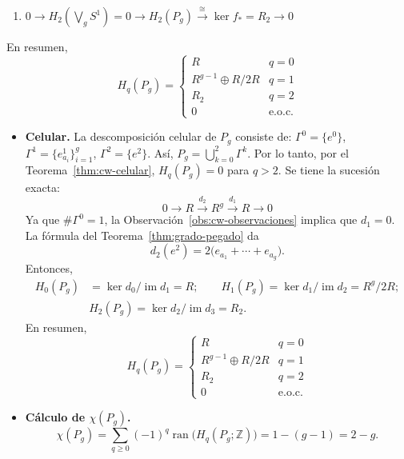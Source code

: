 \documentclass[11pt,a4paper]{article}
\theoremstyle{plain}
\theoremstyle{definition}
\theoremstyle{remark}
\newcommand{\ZZ}{\mathbb Z}
\DeclareMathOperator{\ran}{ran}
\DeclareMathOperator{\im}{im}
\begin{document}
\begin{enumerate}[label=\arabic*.,leftmargin=*]
\begin{enumerate}[label=\alph*)]
\begin{enumerate}[label=\arabic*)]
Sea
\[
\phi:R^g\twoheadrightarrow R^{g-1}\oplus R/2R, \qquad
(r_1,\dots,r_g)\mapsto(r_1-r_g,r_2-r_g\dots,r_{g-1}-r_g,r_g).
\]
Entonces, $\ker\phi=\im f_*$. De esta manera, se sigue el isomorfismo:
\[
R^g/2R\cong R^{g-1}\oplus R/2R.
\]
\item $0\to H_2\left(\bigvee_gS^1\right)=0\to H_2(P_g)\xrightarrow{\cong}\ker f_*=R_2\to0$
\end{enumerate}
En resumen,
\[
H_q(P_g)=\begin{cases}R & q=0\\ R^{g-1}\oplus R/2R & q=1\\ R_2 & q=2\\0 & \text{e.o.c.}\end{cases}
\]
\begin{itemize}
\item \textbf{Celular.} La descomposición celular de $P_g$ consiste de:
$\Gamma^0=\{e^0\}$, $\Gamma^1=\{e^1_{a_i}\}_{i=1}^g$, $\Gamma^2=\{e^2\}$.
Así, $P_g=\bigcup_{k=0}^2\Gamma^k$. Por lo tanto, por el
Teorema~\ref{thm:cw-celular}, $H_q(P_g)=0$ para $q>2$. Se tiene la
sucesión exacta:
\[
0\to R\xrightarrow{d_2}R^g\xrightarrow{d_1}R\to0
\]
Ya que $\#\Gamma^0=1$, la Observación~\ref{obs:cw-observaciones} implica
que $d_1=0$. La fórmula del Teorema~\ref{thm:grado-pegado} da
\[
d_2(e^2)=2\big(e_{a_1}+\cdots+e_{a_g}\big).
\]
Entonces,
\[
\begin{aligned}
H_0(P_g)&=\ker d_0/\im d_1=R; \qquad H_1(P_g)=\ker d_1/\im d_2=R^g/2R;\\
&H_2(P_g)=\ker d_2/\im d_3=R_2.
\end{aligned}
\]
En resumen,
\[
H_q(P_g)=\begin{cases}R & q=0\\ R^{g-1}\oplus R/2R & q=1\\ R_2 & q=2\\0 & \text{e.o.c.}\end{cases}
\]
\item \textbf{Cálculo de $\chi(P_g)$.}
\[
\chi(P_g)=\sum_{q\ge0}(-1)^q\ran\big(H_q(P_g;\ZZ)\big)=1-(g-1)=2-g.
\]
\end{itemize}
\end{enumerate}


\end{enumerate}
\end{document}
